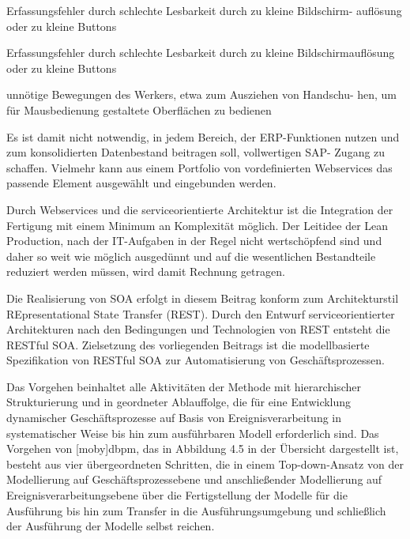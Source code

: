 Erfassungsfehler durch schlechte Lesbarkeit durch zu kleine Bildschirm- auflösung oder zu kleine Buttons

Erfassungsfehler durch schlechte Lesbarkeit durch zu kleine Bildschirmauflösung oder zu kleine Buttons

unnötige Bewegungen des Werkers, etwa zum Ausziehen von Handschu- hen, um für Mausbedienung gestaltete Oberflächen zu bedienen

Es ist damit nicht notwendig, in jedem Bereich, der ERP-Funktionen nutzen und zum konsolidierten Datenbestand beitragen soll, vollwertigen SAP- Zugang zu schaffen. Vielmehr kann aus einem Portfolio von vordefinierten Webservices das passende Element ausgewählt und eingebunden werden.

Durch Webservices und die serviceorientierte Architektur ist die Integration der Fertigung mit einem Minimum an Komplexität möglich. Der Leitidee der Lean Production, nach der IT-Aufgaben in der Regel nicht wertschöpfend sind und daher so weit wie möglich ausgedünnt und auf die wesentlichen Bestandteile reduziert werden müssen, wird damit Rechnung getragen.


Die Realisierung von SOA erfolgt in diesem Beitrag konform zum Architekturstil REpresentational State Transfer (REST). Durch den Entwurf serviceorientierter Architekturen nach den Bedingungen und Technologien von REST entsteht die RESTful SOA. Zielsetzung des vorliegenden Beitrags ist die modellbasierte Spezifikation von RESTful SOA zur Automatisierung von Geschäftsprozessen. 

Das Vorgehen beinhaltet alle Aktivitäten der Methode mit hierarchischer Strukturierung und in geordneter Ablauffolge, die für eine Entwicklung dynamischer Geschäftsprozesse auf Basis von Ereignisverarbeitung in systematischer Weise bis hin zum ausführbaren Modell erforderlich sind. Das Vorgehen von [moby]dbpm, das in Abbildung 4.5 in der Übersicht dargestellt ist, besteht aus vier übergeordneten Schritten, die in einem Top-down-Ansatz von der Modellierung auf Geschäftsprozessebene und anschließender Modellierung auf Ereignisverarbeitungsebene über die Fertigstellung der Modelle für die Ausführung bis hin zum Transfer in die Ausführungsumgebung und schließlich der Ausführung der Modelle selbst reichen.



